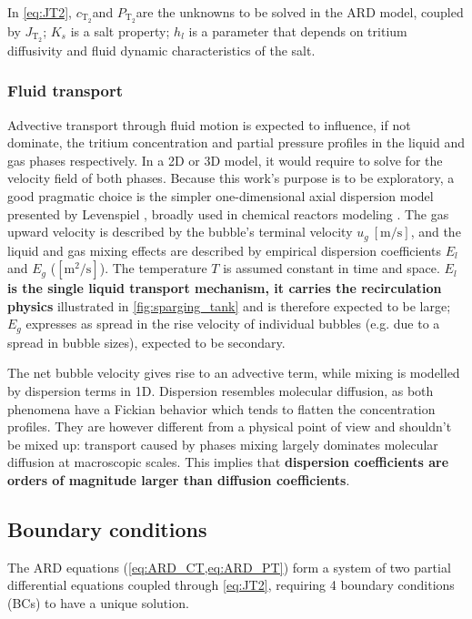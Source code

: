\documentclass[a4paper,11pt,oneside]{report}
\newcommand{\PT}{\ensuremath{P_\mathrm{T_2}}}
\newcommand{\CT}{\ensuremath{c_\mathrm{T_2}}}
\newcommand{\JT}{\ensuremath{J_\mathrm{T_2}}}
\begin{document}
In \cref{eq:JT2}, \CT and \PT are the unknowns to be solved in the ARD model, coupled by \JT; $K_s$ is a salt property; $h_l$ is a parameter that depends on tritium diffusivity and fluid dynamic characteristics of the salt. 

\subsubsection{Fluid transport}
Advective transport through fluid motion is expected to influence, if not dominate, the tritium concentration and partial pressure profiles in the liquid and gas phases respectively. In a 2D or 3D model, it would require to solve for the velocity field of both phases. Because this work's purpose is to be exploratory, a good pragmatic choice is the simpler one-dimensional axial dispersion model presented by Levenspiel \cite{levenspiel_chemical_1999}, broadly used in chemical reactors modeling \cite{schluter_modeling_1992}. The gas upward velocity is described by the bubble's terminal velocity $u_g \:\mathrm{[m/s]}$, and the liquid and gas mixing effects are described by empirical dispersion coefficients $E_l$ and $E_g$ ($\mathrm{[m^2/s]}$). The temperature $T$ is assumed constant in time and space. \textbf{$E_l$ is the single liquid transport mechanism, it carries the recirculation physics} illustrated in \cref{fig:sparging_tank} and is therefore expected to be large; $E_g$ expresses as spread in the rise velocity of individual bubbles (e.g. due to a spread in bubble sizes), expected to be secondary. 
\par

The net bubble velocity gives rise to an advective term, while mixing is modelled by dispersion terms in 1D. Dispersion resembles molecular diffusion, as both phenomena have a Fickian behavior which tends to flatten the concentration profiles. They are however different from a physical point of view and shouldn't be mixed up: transport caused by phases mixing largely dominates molecular diffusion at macroscopic scales. This implies that \textbf{dispersion coefficients are orders of magnitude larger than diffusion coefficients}. 


\subsection{Boundary conditions}
The ARD equations (\cref{eq:ARD_CT,eq:ARD_PT}) form a system of two partial differential equations coupled through \cref{eq:JT2}, requiring 4 boundary conditions (BCs) to have a unique solution.
\end{document}
